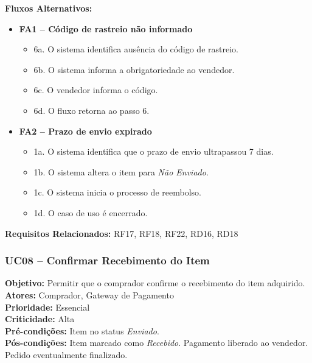﻿\documentclass[12pt,a4paper]{article}
\begin{document}
\vspace{0.5em}
\noindent\textbf{Fluxos Alternativos:}
\begin{itemize}[leftmargin=*]
    \item \textbf{FA1 – Código de rastreio não informado}
    \begin{itemize}[label={}, leftmargin=0.5cm]
        \item 6a. O sistema identifica ausência do código de rastreio.
        \item 6b. O sistema informa a obrigatoriedade ao vendedor.
        \item 6c. O vendedor informa o código.
        \item 6d. O fluxo retorna ao passo 6.
    \end{itemize}

    \item \textbf{FA2 – Prazo de envio expirado}
    \begin{itemize}[label={}, leftmargin=0.5cm]
        \item 1a. O sistema identifica que o prazo de envio ultrapassou 7 dias.
        \item 1b. O sistema altera o item para \textit{Não Enviado}.
        \item 1c. O sistema inicia o processo de reembolso.
        \item 1d. O caso de uso é encerrado.
    \end{itemize}
\end{itemize}

\vspace{0.5em}
\noindent\textbf{Requisitos Relacionados:} RF17, RF18, RF22, RD16, RD18


\subsubsection{UC08 – Confirmar Recebimento do Item}
\label{uc:06}
\noindent\textbf{Objetivo:} Permitir que o comprador confirme o recebimento do item adquirido.\\
\textbf{Atores:} Comprador, Gateway de Pagamento\\
\textbf{Prioridade:} Essencial\\
\textbf{Criticidade:} Alta\\
\textbf{Pré-condições:} Item no status \textit{Enviado}.\\
\textbf{Pós-condições:} Item marcado como \textit{Recebido}. Pagamento liberado ao vendedor. Pedido eventualmente finalizado.
\end{document}
